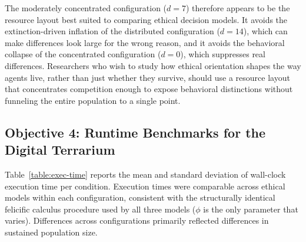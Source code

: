 \documentclass{icsthesis}
\begin{document}
\begin{mainmatter}
The moderately concentrated configuration ($d = 7$) therefore appears to be the resource layout best suited to comparing ethical decision models. It avoids the extinction-driven inflation of the distributed configuration ($d = 14$), which can make differences look large for the wrong reason, and it avoids the behavioral collapse of the concentrated configuration ($d = 0$), which suppresses real differences. Researchers who wish to study how ethical orientation shapes the way agents live, rather than just whether they survive, should use a resource layout that concentrates competition enough to expose behavioral distinctions without funneling the entire population to a single point.

		\subsection{Objective 4: Runtime Benchmarks for the Digital Terrarium}

Table~\ref{table:exec-time} reports the mean and standard deviation of wall-clock execution time per condition. Execution times were comparable across ethical models within each configuration, consistent with the structurally identical felicific calculus procedure used by all three models ($\phi$ is the only parameter that varies). Differences across configurations primarily reflected differences in sustained population size.


\end{mainmatter}
\end{document}
